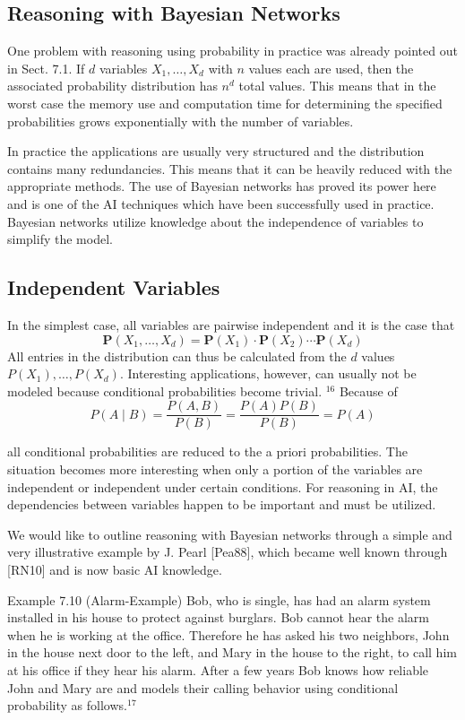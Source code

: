 \documentclass[10pt]{book}
\begin{document}
\subsection{Reasoning with Bayesian Networks}
One problem with reasoning using probability in practice was already pointed out in Sect. 7.1. If $d$ variables $X_{1}, \ldots, X_{d}$ with $n$ values each are used, then the associated probability distribution has $n^{d}$ total values. This means that in the worst case the memory use and computation time for determining the specified probabilities grows exponentially with the number of variables.

In practice the applications are usually very structured and the distribution contains many redundancies. This means that it can be heavily reduced with the appropriate methods. The use of Bayesian networks has proved its power here and is one of the AI techniques which have been successfully used in practice. Bayesian networks utilize knowledge about the independence of variables to simplify the model.

\subsection{Independent Variables}
In the simplest case, all variables are pairwise independent and it is the case that
$$
\boldsymbol{P}\left(X_{1}, \ldots, X_{d}\right)=\boldsymbol{P}\left(X_{1}\right) \cdot \boldsymbol{P}\left(X_{2}\right) \cdots \boldsymbol{P}\left(X_{d}\right)
$$
All entries in the distribution can thus be calculated from the $d$ values $P\left(X_{1}\right), \ldots, P\left(X_{d}\right)$. Interesting applications, however, can usually not be modeled because conditional probabilities become trivial. ${ }^{16}$ Because of
$$
P(A \mid B)=\frac{P(A,B)}{P(B)}=\frac{P(A)P(B)}{P(B)}=P(A)
$$

all conditional probabilities are reduced to the a priori probabilities. The situation becomes more interesting when only a portion of the variables are independent or independent under certain conditions. For reasoning in AI, the dependencies between variables happen to be important and must be utilized.

We would like to outline reasoning with Bayesian networks through a simple and very illustrative example by J. Pearl [Pea88], which became well known through [RN10] and is now basic AI knowledge.

Example 7.10 (Alarm-Example) Bob, who is single, has had an alarm system installed in his house to protect against burglars. Bob cannot hear the alarm when he is working at the office. Therefore he has asked his two neighbors, John in the house next door to the left, and Mary in the house to the right, to call him at his office if they hear his alarm. After a few years Bob knows how reliable John and Mary are and models their calling behavior using conditional probability as follows.${ }^{17}$
\end{document}
